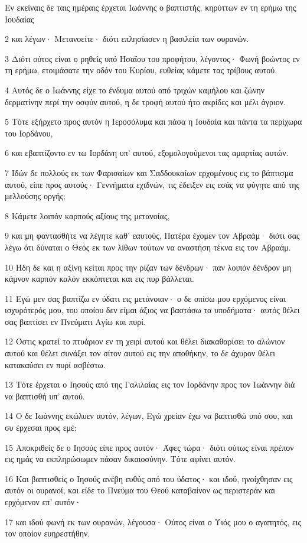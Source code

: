 \par Εν εκείναις δε ταις ημέραις έρχεται Ιωάννης ο βαπτιστής, κηρύττων εν τη ερήμω της Ιουδαίας
\par 2 και λέγων· Μετανοείτε· διότι επλησίασεν η βασιλεία των ουρανών.
\par 3 Διότι ούτος είναι ο ρηθείς υπό Ησαΐου του προφήτου, λέγοντος· Φωνή βοώντος εν τη ερήμω, ετοιμάσατε την οδόν του Κυρίου, ευθείας κάμετε τας τρίβους αυτού.
\par 4 Αυτός δε ο Ιωάννης είχε το ένδυμα αυτού από τριχών καμήλου και ζώνην δερματίνην περί την οσφύν αυτού, η δε τροφή αυτού ήτο ακρίδες και μέλι άγριον.
\par 5 Τότε εξήρχετο προς αυτόν η Ιεροσόλυμα και πάσα η Ιουδαία και πάντα τα περίχωρα του Ιορδάνου,
\par 6 και εβαπτίζοντο εν τω Ιορδάνη υπ' αυτού, εξομολογούμενοι τας αμαρτίας αυτών.
\par 7 Ιδών δε πολλούς εκ των Φαρισαίων και Σαδδουκαίων ερχομένους εις το βάπτισμα αυτού, είπε προς αυτούς· Γεννήματα εχιδνών, τις έδειξεν εις εσάς να φύγητε από της μελλούσης οργής;
\par 8 Κάμετε λοιπόν καρπούς αξίους της μετανοίας,
\par 9 και μη φαντασθήτε να λέγητε καθ' εαυτούς, Πατέρα έχομεν τον Αβραάμ· διότι σας λέγω ότι δύναται ο Θεός εκ των λίθων τούτων να αναστήση τέκνα εις τον Αβραάμ.
\par 10 Ήδη δε και η αξίνη κείται προς την ρίζαν των δένδρων· παν λοιπόν δένδρον μη κάμνον καρπόν καλόν εκκόπτεται και εις πυρ βάλλεται.
\par 11 Εγώ μεν σας βαπτίζω εν ύδατι εις μετάνοιαν· ο δε οπίσω μου ερχόμενος είναι ισχυρότερός μου, του οποίου δεν είμαι άξιος να βαστάσω τα υποδήματα· αυτός θέλει σας βαπτίσει εν Πνεύματι Αγίω και πυρί.
\par 12 Όστις κρατεί το πτυάριον εν τη χειρί αυτού και θέλει διακαθαρίσει το αλώνιον αυτού και θέλει συνάξει τον σίτον αυτού εις την αποθήκην, το δε άχυρον θέλει κατακαύσει εν πυρί ασβέστω.
\par 13 Τότε έρχεται ο Ιησούς από της Γαλιλαίας εις τον Ιορδάνην προς τον Ιωάννην διά να βαπτισθή υπ' αυτού.
\par 14 Ο δε Ιωάννης εκώλυεν αυτόν, λέγων, Εγώ χρείαν έχω να βαπτισθώ υπό σου, και συ έρχεσαι προς εμέ;
\par 15 Αποκριθείς δε ο Ιησούς είπε προς αυτόν· Άφες τώρα· διότι ούτως είναι πρέπον εις ημάς να εκπληρώσωμεν πάσαν δικαιοσύνην. Τότε αφίνει αυτόν.
\par 16 Και βαπτισθείς ο Ιησούς ανέβη ευθύς από του ύδατος· και ιδού, ηνοίχθησαν εις αυτόν οι ουρανοί, και είδε το Πνεύμα του Θεού καταβαίνον ως περιστεράν και ερχόμενον επ' αυτόν·
\par 17 και ιδού φωνή εκ των ουρανών, λέγουσα· Ούτος είναι ο Υιός μου ο αγαπητός, εις τον οποίον ευηρεστήθην.

